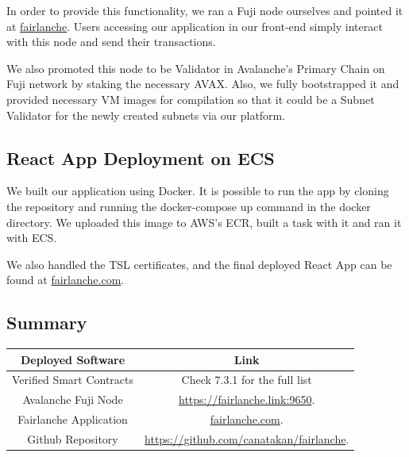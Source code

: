 \documentclass[a4paper,12pt]{report}
\begin{document}
In order to provide this functionality, we ran a Fuji node ourselves and pointed it at \href{https://fairlanche.link:9650}{fairlanche}. Users accessing our application in our front-end simply interact with this node and send their transactions.

We also promoted this node to be Validator in Avalanche’s Primary Chain on Fuji network by staking the necessary AVAX. Also, we fully bootstrapped it and provided necessary VM images for compilation so that it could be a Subnet Validator for the newly created subnets via our platform.

\subsection{ React App Deployment on ECS}
We built our application using Docker. It is possible to run the app by cloning the repository and running the docker-compose up command in the docker directory. We uploaded this image to AWS’s ECR, built a task with it and ran it with ECS.

We also handled the TSL certificates, and the final deployed React App can be found at  \href{https://fairlanche.com/}{fairlanche.com}.

\subsection{Summary}
\begin{table}[H]
	\begin{tabular}{|c|c|}
		\hline
		\textbf{Deployed Software} & \textbf{Link}                           \\ \hline
		Verified Smart Contracts   & Check 7.3.1 for the full list           \\ \hline
		Avalanche Fuji Node        &  \href{https://fairlanche.link:9650}{https://fairlanche.link:9650}.           \\ \hline
		Fairlanche Application     & \href{https://fairlanche.com/}{fairlanche.com}.               \\ \hline
		Github Repository          & \href{https://github.com/canatakan/fairlanche}{https://github.com/canatakan/fairlanche}.    \\ \hline
	\end{tabular}
\end{table}
\end{document}
